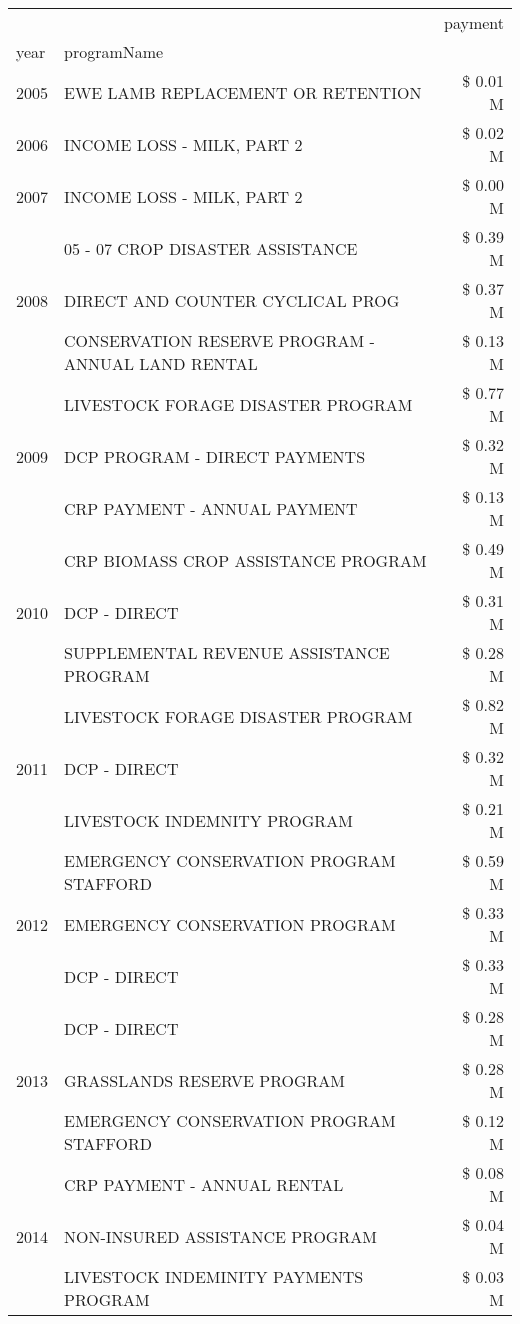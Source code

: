 \begin{tabular}{llr}
\toprule
 &  & payment \\
year & programName &  \\
\midrule
2005 & EWE LAMB REPLACEMENT OR RETENTION & \$ 0.01 M \\
\cline{1-3}
2006 & INCOME LOSS - MILK, PART 2 & \$ 0.02 M \\
\cline{1-3}
2007 & INCOME LOSS - MILK, PART 2 & \$ 0.00 M \\
\cline{1-3}
\multirow[t]{3}{*}{2008} & 05 - 07 CROP DISASTER ASSISTANCE & \$ 0.39 M \\
 & DIRECT AND COUNTER CYCLICAL PROG & \$ 0.37 M \\
 & CONSERVATION RESERVE PROGRAM - ANNUAL LAND RENTAL & \$ 0.13 M \\
\cline{1-3}
\multirow[t]{3}{*}{2009} & LIVESTOCK FORAGE DISASTER  PROGRAM & \$ 0.77 M \\
 & DCP PROGRAM - DIRECT PAYMENTS & \$ 0.32 M \\
 & CRP PAYMENT - ANNUAL PAYMENT & \$ 0.13 M \\
\cline{1-3}
\multirow[t]{3}{*}{2010} & CRP BIOMASS CROP ASSISTANCE PROGRAM & \$ 0.49 M \\
 & DCP - DIRECT & \$ 0.31 M \\
 & SUPPLEMENTAL REVENUE ASSISTANCE PROGRAM & \$ 0.28 M \\
\cline{1-3}
\multirow[t]{3}{*}{2011} & LIVESTOCK FORAGE DISASTER PROGRAM & \$ 0.82 M \\
 & DCP - DIRECT & \$ 0.32 M \\
 & LIVESTOCK INDEMNITY PROGRAM & \$ 0.21 M \\
\cline{1-3}
\multirow[t]{3}{*}{2012} & EMERGENCY CONSERVATION PROGRAM STAFFORD & \$ 0.59 M \\
 & EMERGENCY CONSERVATION PROGRAM & \$ 0.33 M \\
 & DCP - DIRECT & \$ 0.33 M \\
\cline{1-3}
\multirow[t]{3}{*}{2013} & DCP - DIRECT & \$ 0.28 M \\
 & GRASSLANDS RESERVE PROGRAM & \$ 0.28 M \\
 & EMERGENCY CONSERVATION PROGRAM STAFFORD & \$ 0.12 M \\
\cline{1-3}
\multirow[t]{3}{*}{2014} & CRP PAYMENT - ANNUAL RENTAL & \$ 0.08 M \\
 & NON-INSURED ASSISTANCE PROGRAM & \$ 0.04 M \\
 & LIVESTOCK INDEMINITY PAYMENTS PROGRAM & \$ 0.03 M \\

\end{tabular}
